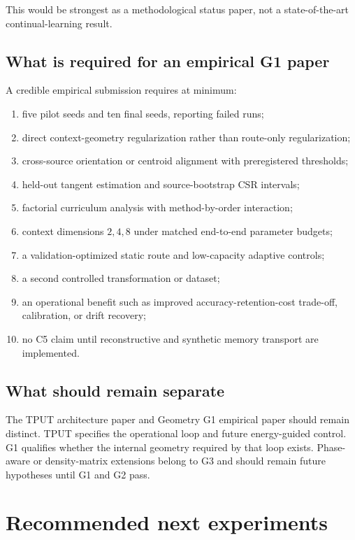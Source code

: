 \documentclass[11pt,a4paper]{article}
\begin{document}
This would be strongest as a methodological status paper, not a state-of-the-art continual-learning result.

\subsection{What is required for an empirical G1 paper}

A credible empirical submission requires at minimum:

\begin{enumerate}
\item five pilot seeds and ten final seeds, reporting failed runs;
\item direct context-geometry regularization rather than route-only regularization;
\item cross-source orientation or centroid alignment with preregistered thresholds;
\item held-out tangent estimation and source-bootstrap CSR intervals;
\item factorial curriculum analysis with method-by-order interaction;
\item context dimensions $2,4,8$ under matched end-to-end parameter budgets;
\item a validation-optimized static route and low-capacity adaptive controls;
\item a second controlled transformation or dataset;
\item an operational benefit such as improved accuracy-retention-cost trade-off, calibration, or drift recovery;
\item no C5 claim until reconstructive and synthetic memory transport are implemented.
\end{enumerate}

\subsection{What should remain separate}

The TPUT architecture paper and Geometry G1 empirical paper should remain distinct. TPUT specifies the operational loop and future energy-guided control. G1 qualifies whether the internal geometry required by that loop exists. Phase-aware or density-matrix extensions belong to G3 and should remain future hypotheses until G1 and G2 pass.

\section{Recommended next experiments}
\end{document}
